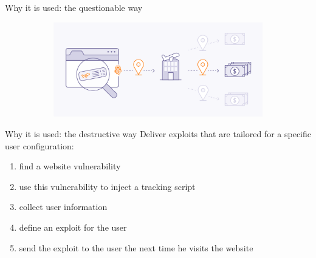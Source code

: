\begin{frame}{Why it is used: the questionable way}
\begin{itemize}
\begin{figure}
            \begin{subfigure}{0.45\textwidth}
              \includegraphics[width=\linewidth]{images/flight.png}
            \end{subfigure}
          \end{figure}
  \end{itemize}
\end{frame}

\begin{frame}{Why it is used: the destructive way}
  Deliver exploits that are tailored for a specific user configuration:
  \vspace{0.5cm}
  \begin{enumerate}
    \item find a website vulnerability
          \vspace{0.5cm}
    \item use this vulnerability to inject a tracking script
          \vspace{0.5cm}
    \item collect user information
          \vspace{0.5cm}
    \item define an exploit for the user
          \vspace{0.5cm}
    \item send the exploit to the user the next time he visits the website
  \end{enumerate}
\end{frame}
